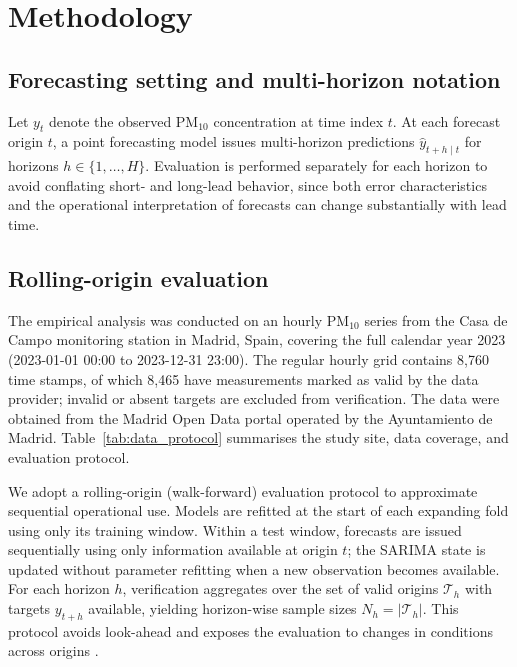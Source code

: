 \documentclass{article}
\begin{document}
\section{Methodology}

\subsection{Forecasting setting and multi-horizon notation}

Let $y_t$ denote the observed PM$_{10}$ concentration at time index $t$.
At each forecast origin $t$, a point forecasting model issues multi-horizon
predictions $\hat{y}_{t+h\mid t}$ for horizons $h \in \{1,\dots,H\}$.
Evaluation is performed separately for each horizon to avoid conflating
short- and long-lead behavior, since both error characteristics and the
operational interpretation of forecasts can change substantially with lead
time.

\subsection{Rolling-origin evaluation}

The empirical analysis was conducted on an hourly PM$_{10}$ series from the
Casa de Campo monitoring station in Madrid, Spain, covering the full calendar
year 2023 (2023-01-01 00:00 to 2023-12-31 23:00).  The regular hourly grid
contains 8,760 time stamps, of which 8,465 have measurements marked as valid
by the data provider; invalid or absent targets are excluded from verification.
The data were obtained from the Madrid Open Data portal operated by the
Ayuntamiento de Madrid.
Table~\ref{tab:data_protocol} summarises the study site, data coverage, and
evaluation protocol.

We adopt a rolling-origin (walk-forward) evaluation protocol to approximate
sequential operational use.
Models are refitted at the start of each expanding fold using only its training
window.  Within a test window, forecasts are issued sequentially using only
information available at origin $t$; the SARIMA state is updated without
parameter refitting when a new observation becomes available.
For each horizon $h$, verification aggregates over the set of valid origins
$\mathcal{T}_h$ with targets $y_{t+h}$ available, yielding horizon-wise sample
sizes $N_h = |\mathcal{T}_h|$.
This protocol avoids look-ahead and exposes the evaluation to changes in
conditions across origins \citep{tashman2000}.
\end{document}
